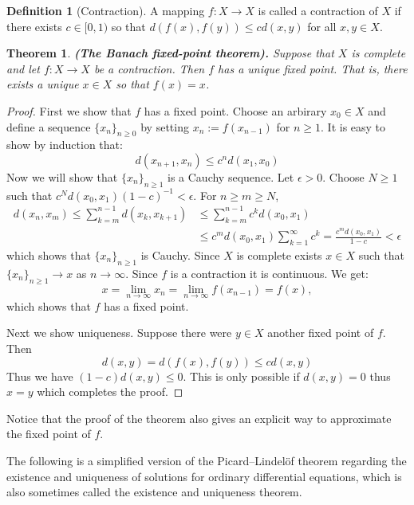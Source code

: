 \documentclass[11pt,a4paper]{article}
\theoremstyle{definition}
\newtheorem{definition}{Definition}[section]
\theoremstyle{plain}
\newtheorem{theorem}{Theorem}[section]
\renewcommand{\tt}[1]{\textnormal{\textbf{(#1).}}} %
\begin{document}
  \begin{definition}[Contraction]
    A mapping $f \colon X \to X$ is called a contraction of $X$ if there 
    exists $c \in [0, 1)$ so that $d(f(x),f(y)) \le cd(x,y)$ for all 
    $x,y \in X$.
  \end{definition}

  \begin{theorem}
    \tt{The Banach fixed-point theorem}
    Suppose that $X$ is complete
    and let $f \colon X \to X$ be a contraction. Then $f$ has a unique fixed 
    point. That is, there exists a unique $x \in X$ so that $f(x) = x$.
  \end{theorem}
  \begin{proof}
    First we show that $f$ has a fixed point. Choose an arbirary $x_0 \in X$
    and define a sequence $\{x_n\}_{n \geq 0}$ by setting
    $x_n := f(x_{n-1})$ for $n \geq 1$. It is easy to show by induction
    that:
    \[
      d(x_{n+1},x_{n}) \le c^n d(x_1,x_0)
    \]
    Now we will show that $\{x_n\}_{n \geq 1}$ is a Cauchy sequence.
    Let $\epsilon > 0$. Choose $N \geq 1$ such that
    $c^N d(x_0,x_1) (1-c)^{-1} < \epsilon$. For $n \geq m \geq N$,
    \begin{align*}
      d(x_n,x_m) \le 
      \sum_{k=m}^{n-1}{d(x_{k},x_{k+1})} &\le 
      \sum_{k=m}^{n-1}{c^k d(x_{0},x_{1})} \\ &\le
      c^m d(x_0,x_1) \sum_{k=1}^{\infty}{c^k} =
      \frac{c^m d(x_0,x_1)}{1-c} < \epsilon
    \end{align*}
    which shows that $\{x_n\}_{n \geq 1}$ is Cauchy. Since $X$ is complete
    exists $x \in X$ such that $\{x_n\}_{n \geq 1} \to x$ as $n \to \infty$.
    Since $f$ is a contraction it is continuous. We get:
    \[
      x = \lim_{n\to\infty}{x_n} = \lim_{n \to \infty}{f(x_{n-1})} = f(x),
    \]
    which shows that $f$ has a fixed point.
    
    Next we show uniqueness. Suppose there were $y \in X$ another fixed
    point of $f$. Then
    \[
      d(x,y) = d(f(x),f(y)) \le cd(x,y)
    \]
    Thus we have $(1-c)d(x,y) \le 0$. This is only possible if $d(x,y)=0$
    thus $x=y$ which completes the proof.
  \end{proof}

  Notice that the proof of the theorem also gives an explicit way to 
  approximate the fixed point of $f$.

  The following is a simplified version of the Picard–Lindelöf theorem 
  regarding the existence and uniqueness of solutions for ordinary 
  differential equations, which is also sometimes called the existence and 
  uniqueness theorem.
\end{document}
